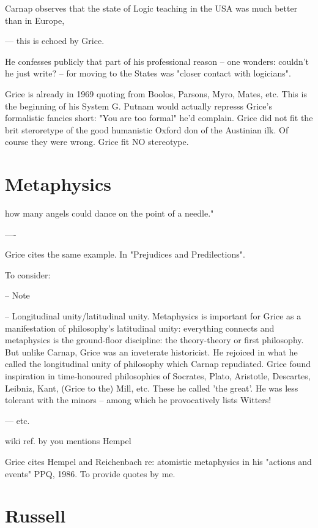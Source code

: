 \documentclass[10pt,titlepage]{book}
\begin{document}
{ Carnap observes that the state of Logic teaching in  the USA was much better than in Europe, 
 
--- this is echoed by Grice.
 
He confesses publicly that part of his professional reason -- one wonders:  
couldn't he just write? -- for moving to the States was "closer contact 
with  logicians".
 
Grice is already in 1969 quoting from Boolos, Parsons, Myro, Mates, etc.  
This is the beginning of his System G. Putnam would actually represss Grice's formalistic fancies short: "You are too formal" he'd complain.
Grice did not fit the brit steroretype of the good humanistic Oxford don of the 
Austinian ilk. Of  course they were wrong.
Grice fit NO stereotype.

\section{Metaphysics}

how many angels could dance on the point of a needle." 
 
----
 
Grice cites the same example.
In "Prejudices and Predilections".
 
To consider:
 
-- Note
 
-- Longitudinal unity/latitudinal unity. Metaphysics is important for Grice 
 as a manifestation of philosophy's latitudinal unity: everything connects 
and  metaphysics is the ground-floor discipline: the theory-theory or first  
philosophy. But unlike Carnap, Grice was an inveterate historicist. 
He 
rejoiced  in what he called the longitudinal unity of philosophy which Carnap 
repudiated.
Grice found inspiration in time-honoured philosophies of 
Socrates, Plato,  Aristotle, Descartes, Leibniz, Kant, (Grice to the) Mill, etc. 
These he called  'the great'. He was less tolerant with the minors -- among 
which he  provocatively lists Witters!
 
--- etc. 

wiki ref. by you mentions Hempel
 
Grice cites Hempel and Reichenbach re: atomistic metaphysics in his  
"actions and events" PPQ, 1986. To provide quotes by me.
 
\section{Russell}

}
\end{document}
